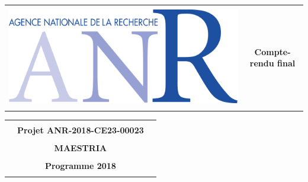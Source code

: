 \begin{table}[htbp]
    \centering
    \begin{tabular}{|c|c|}
    \hline
    &\\
      \multirow{3}{*}{\includegraphics[width=0.25\columnwidth]{img/logo_anr.png}}   & \\
      &\LARGE{\textbf{\textcolor{bleu}{Compte-rendu final}}} \\
      & \\ 
      &\\\hline
    \end{tabular}

\end{table}
\vspace{1.2cm}
\begin{table}[htbp]
    \centering
    \begin{tabular}{|m{2.5cm}cm{2.5cm}|}
  \hline 
&&  \\
&  \Large{\textbf{\textcolor{bleu}{Projet ANR-2018-CE23-00023}}}& \\
&&  \\
&\huge{\textbf{\textcolor{bleu}{MAESTRIA}}}& \\
&&  \\
&\Large{\textbf{\textcolor{bleu}{Programme 2018}}}&\\
&&\\\hline
    \end{tabular}

\end{table}   

\setcounter{tocdepth}{2}
\tableofcontents
\newpage